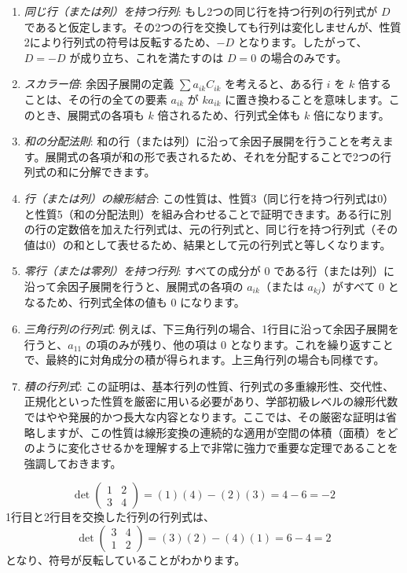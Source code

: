 \begin{thm}[行列式の性質]
\begin{proof*}
\begin{enumerate}
    \item \emph{同じ行（または列）を持つ行列}: もし2つの同じ行を持つ行列の行列式が $D$ であると仮定します。その2つの行を交換しても行列は変化しませんが、性質2により行列式の符号は反転するため、$-D$ となります。したがって、$D = -D$ が成り立ち、これを満たすのは $D=0$ の場合のみです。
    \item \emph{スカラー倍}: 余因子展開の定義 $\sum a_{ik}C_{ik}$ を考えると、ある行 $i$ を $k$ 倍することは、その行の全ての要素 $a_{ik}$ が $k a_{ik}$ に置き換わることを意味します。このとき、展開式の各項も $k$ 倍されるため、行列式全体も $k$ 倍になります。
    \item \emph{和の分配法則}: 和の行（または列）に沿って余因子展開を行うことを考えます。展開式の各項が和の形で表されるため、それを分配することで2つの行列式の和に分解できます。
    \item \emph{行（または列）の線形結合}: この性質は、性質3（同じ行を持つ行列式は0）と性質5（和の分配法則）を組み合わせることで証明できます。ある行に別の行の定数倍を加えた行列式は、元の行列式と、同じ行を持つ行列式（その値は0）の和として表せるため、結果として元の行列式と等しくなります。
    \item \emph{零行（または零列）を持つ行列}: すべての成分が $0$ である行（または列）に沿って余因子展開を行うと、展開式の各項の $a_{ik}$（または $a_{kj}$）がすべて $0$ となるため、行列式全体の値も $0$ になります。
    \item \emph{三角行列の行列式}: 例えば、下三角行列の場合、1行目に沿って余因子展開を行うと、$a_{11}$ の項のみが残り、他の項は $0$ となります。これを繰り返すことで、最終的に対角成分の積が得られます。上三角行列の場合も同様です。
    \item \emph{積の行列式}: この証明は、基本行列の性質、行列式の多重線形性、交代性、正規化といった性質を厳密に用いる必要があり、学部初級レベルの線形代数ではやや発展的かつ長大な内容となります。ここでは、その厳密な証明は省略しますが、この性質は線形変換の連続的な適用が空間の体積（面積）をどのように変化させるかを理解する上で非常に強力で重要な定理であることを強調しておきます。
\end{enumerate}
\end{proof*}
\end{thm}

\begin{ex}
    \[\det\begin{pmatrix} 1 & 2 \\ 3 & 4 \end{pmatrix} = (1)(4)-(2)(3) = 4-6=-2\]
    1行目と2行目を交換した行列の行列式は、
    \[\det\begin{pmatrix} 3 & 4 \\ 1 & 2 \end{pmatrix} = (3)(2)-(4)(1) = 6-4=2\]
    となり、符号が反転していることがわかります。
\end{ex}


